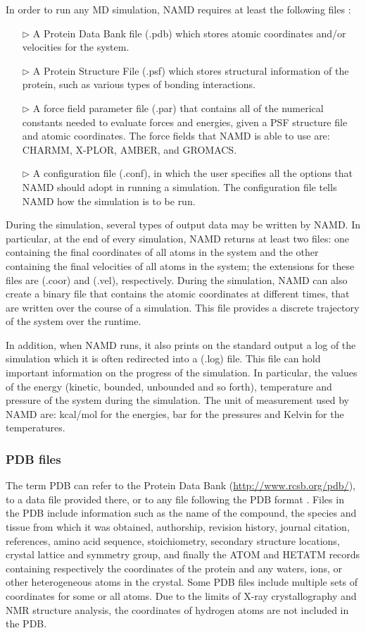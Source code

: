 In order to run any MD simulation, NAMD requires at least the following files \cite{ref:NAMD-VMD_Kukol}:
\begin{itemize}
\item[$\triangleright$] A Protein Data Bank file (.pdb) which stores atomic coordinates and/or velocities for the system.
\item[$\triangleright$] A Protein Structure File (.psf) which stores structural information of the protein, such as various types of bonding interactions.
\item[$\triangleright$] A force field parameter file (.par) that contains all of the numerical constants needed to evaluate forces and energies, given a PSF structure file and atomic coordinates. The force fields that NAMD is able to use are: CHARMM, X-PLOR, AMBER, and GROMACS. 
\item[$\triangleright$] A configuration file (.conf), in which the user specifies all the options that NAMD should adopt in running a simulation. The configuration file tells NAMD how the simulation is to be run.
\end{itemize}
During the simulation, several types of output data may be written by NAMD. In particular, at the end of every simulation, NAMD returns at least two files: 
one containing the final coordinates of all atoms in the system and the other containing the final velocities of all atoms in the system; 
the extensions for these files are (.coor) and (.vel), respectively. During the simulation, NAMD can also create a binary file that contains the atomic coordinates at different times, that are written over the course of a simulation. This file provides a discrete trajectory of the system over the runtime. 

In addition, when NAMD runs, it also prints on the standard output a log of the simulation which it is often redirected into a (.log) file. This file can hold important information on the progress of the simulation. In particular, the values of the energy (kinetic, bounded, unbounded and so forth), temperature and pressure of the system during the simulation. The unit of measurement used by NAMD are: kcal/mol for the energies, bar for the pressures and Kelvin for the temperatures.

\subsubsection{PDB files}\label{sssec:PDB}
The term PDB can refer to the Protein Data Bank (\url{http://www.rcsb.org/pdb/}), to a data file provided there, or to any file following the PDB format \cite{bernstein1977protein}. Files in the PDB include information such as the name of the compound, the species and tissue from which it was obtained, authorship, revision history, journal citation, references, amino acid sequence, stoichiometry, secondary structure locations, crystal lattice and symmetry group, and finally the ATOM and HETATM records containing respectively the coordinates of the protein and any waters, ions, or other heterogeneous atoms in the crystal. Some PDB files include multiple sets of coordinates for some or all atoms. Due to the limits of X-ray crystallography and NMR structure analysis, the coordinates of hydrogen atoms are not included in the PDB.

